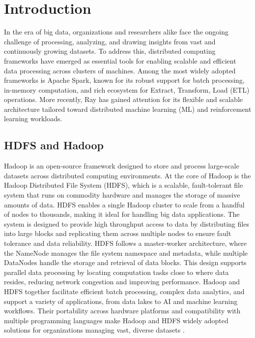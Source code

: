 \documentclass[conference]{IEEEtran}
\begin{document}
\section{Introduction}
In the era of big data, organizations and researchers alike face the ongoing challenge of
processing, analyzing, and drawing insights from vast and continuously growing datasets.
To address this, distributed computing frameworks have emerged as essential tools for
enabling scalable and efficient data processing across clusters of machines. Among the
most widely adopted frameworks is Apache Spark, known for its robust support for batch
processing, in-memory computation, and rich ecosystem for Extract, Transform, Load (ETL)
operations. More recently, Ray has gained attention for its flexible and scalable
architecture tailored toward distributed machine learning (ML) and reinforcement
learning workloads.

\subsection{HDFS and Hadoop}
Hadoop is an open-source framework designed to store and process large-scale datasets across
distributed computing environments. At the core of Hadoop is the Hadoop Distributed File
System (HDFS), which is a scalable, fault-tolerant file system that runs on commodity hardware and
manages the storage of massive amounts of data. HDFS enables a single Hadoop cluster to scale
from a handful of nodes to thousands, making it ideal for handling big data applications.
The system is designed to provide high throughput access to data by distributing files into large
blocks and replicating them across multiple nodes to ensure fault tolerance and data reliability.
HDFS follows a master-worker architecture, where the NameNode manages the file system namespace
and metadata, while multiple DataNodes handle the storage and retrieval of data blocks.
This design supports parallel data processing by locating computation tasks close to where data
resides, reducing network congestion and improving performance. Hadoop and HDFS together
facilitate efficient batch processing, complex data analytics, and support a variety of
applications, from data lakes to AI and machine learning workflows. Their portability across
hardware platforms and compatibility with multiple programming languages make Hadoop and
HDFS widely adopted solutions for organizations managing vast,
diverse datasets \cite{hdfs}.
\end{document}
